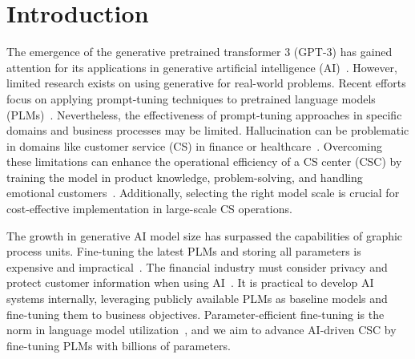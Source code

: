 \documentclass[sigconf]{acmart}
\begin{document}



\maketitle


\section{Introduction}
The emergence of the generative pretrained transformer 3 (GPT-3) has gained attention for its applications in generative artificial intelligence (AI)~\cite{brown2020gpt3, ouyang2022training}. However, limited research exists on using generative for real-world problems. Recent efforts focus on applying prompt-tuning techniques to pretrained language models (PLMs)~\cite{white2023prompt}. Nevertheless, the effectiveness of prompt-tuning approaches in specific domains and business processes may be limited. Hallucination can be problematic in domains like customer service (CS) in finance or healthcare~\cite{eloundou2023gpts, peng2023check}. Overcoming these limitations can enhance the operational efficiency of a CS center (CSC) by training the model in product knowledge, problem-solving, and handling emotional customers~\cite{li2023chatdoctor}. Additionally, selecting the right model scale is crucial for cost-effective implementation in large-scale CS operations.

The growth in generative AI model size has surpassed the capabilities of graphic process units. Fine-tuning the latest PLMs and storing all parameters is expensive and impractical~\cite{lialin2023scaling}. The financial industry must consider privacy and protect customer information when using AI~\cite{Ayling2022}. It is practical to develop AI systems internally, leveraging publicly available PLMs as baseline models and fine-tuning them to business objectives. Parameter-efficient fine-tuning is the norm in language model utilization~\cite{ding2023,liu2023goat}, and we aim to advance AI-driven CSC by fine-tuning PLMs with billions of parameters.
\end{document}
